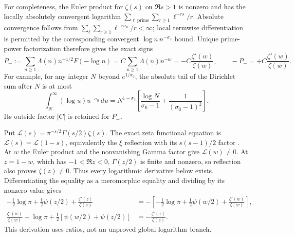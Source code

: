 \documentclass[11pt,a4paper]{article}
\providecommand{\dd}{\,d}
\begin{document}
For completeness, the Euler product for $\zeta(s)$ on $\Re s>1$
\cite{a03ma:Zeta} is nonzero and has the locally absolutely convergent logarithm
$\sum_{\ell\ \mathrm{prime}}\sum_{r\ge1}\ell^{-rs}/r$.
Absolute convergence follows from
$\sum_\ell\sum_{r\ge1}\ell^{-r\sigma_0}/r<\infty$;
local termwise differentiation is permitted by the corresponding convergent
$\log n\,n^{-\sigma_0}$ bound. Unique prime-power factorization therefore
gives the exact signs
\begin{equation}\tag{MA20}
 P_-:=\sum_{n\ge1}\Lambda(n)n^{-1/2}F(-\log n)
 =C\sum_{n\ge1}\Lambda(n)n^{-w}
 =-C\frac{\zeta'(w)}{\zeta(w)},\qquad
 -P_-=+C\frac{\zeta'(w)}{\zeta(w)}.
\end{equation}
For example, for any integer $N$ beyond $e^{1/\sigma_0}$, the absolute tail
of the Dirichlet sum after $N$ is at most
\[
 \int_N^\infty(\log u)u^{-\sigma_0}\dd u
 =N^{1-\sigma_0}\left[\frac{\log N}{\sigma_0-1}
                       +\frac1{(\sigma_0-1)^2}\right].
\]
Its outside factor $|C|$ is retained for $P_-$.

Put $\mathscr L(s)=\pi^{-s/2}\Gamma(s/2)\zeta(s)$.
The exact zeta functional equation is $\mathscr L(s)=\mathscr L(1-s)$,
equivalently the $\xi$ reflection with its $s(s-1)/2$ factor
\cite{a03ma:Zeta}. At $w$ the Euler product and the nonvanishing Gamma factor
give $\mathscr L(w)\ne0$. At $z=1-w$, which has $-1<\Re z<0$,
$\Gamma(z/2)$ is finite and nonzero, so reflection also proves
$\zeta(z)\ne0$. Thus every logarithmic derivative below exists.
Differentiating the equality as a meromorphic equality and dividing by its
nonzero value gives
\begin{equation}\tag{MA21}\begin{aligned}
 -\tfrac12\log\pi+\tfrac12\psi(z/2)+\frac{\zeta'(z)}{\zeta(z)}
 &=-\left[-\tfrac12\log\pi+\tfrac12\psi(w/2)
                           +\frac{\zeta'(w)}{\zeta(w)}\right],\\
 \frac{\zeta'(w)}{\zeta(w)}-\log\pi
 +\tfrac12[\psi(w/2)+\psi(z/2)]
 &=-\frac{\zeta'(z)}{\zeta(z)}.
\end{aligned}\end{equation}
This derivation uses ratios, not an unproved global logarithm branch.
\end{document}
